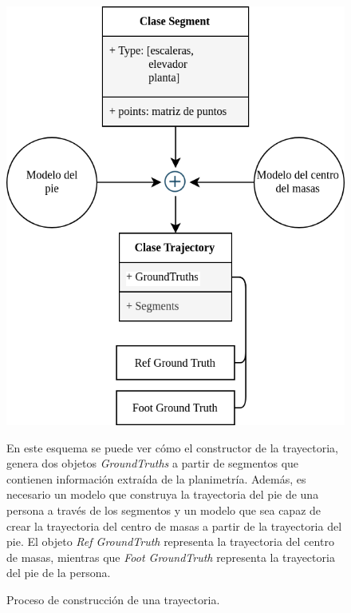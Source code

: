 \begin{figure}[ht!]
    \centering
    \includegraphics[width=0.75\columnwidth]{img/Design/trajectory.png}
    \caption{Proceso de construcción de una trayectoria.}
    \label{TrajectorySch}
    \footnotesize
    En este esquema se puede ver cómo el constructor de la trayectoria, genera dos objetos \emph{GroundTruths} a partir de segmentos que contienen información extraída de la planimetría. Además, es necesario un modelo que construya la trayectoria del pie de una persona a través de los segmentos y un modelo que sea capaz de crear la trayectoria del centro de masas a partir de la trayectoria del pie. El objeto \emph{Ref GroundTruth} representa la trayectoria del centro de masas, mientras que \emph{Foot GroundTruth} representa la trayectoria del pie de la persona.
\end{figure}




